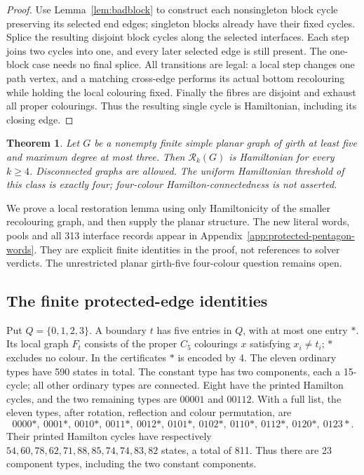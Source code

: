 \documentclass[11pt]{article}
\newtheorem{theorem}{Theorem}[section]
\theoremstyle{remark}
\newcommand{\Rk}{\mathcal R_k}
\numberwithin{equation}{section}
\numberwithin{table}{section}
\begin{document}
\begin{proof}
Use Lemma~\ref{lem:badblock} to construct each nonsingleton block
cycle preserving its selected end edges; singleton blocks already
have their fixed cycles. Splice the resulting disjoint block cycles
along the selected interfaces. Each step joins two cycles into one,
and every later selected edge is still present. The one-block case
needs no final splice. All transitions are legal: a local step changes
one path vertex, and a matching cross-edge performs its actual bottom
recolouring while holding the local colouring fixed. Finally the fibres
are disjoint and exhaust all proper colourings. Thus the resulting
single cycle is Hamiltonian, including its closing edge.
\end{proof}



\begin{theorem}\label{thm:subcubic}
Let $G$ be a nonempty finite simple planar graph of girth at least five
and maximum degree at most three. Then $\Rk(G)$ is Hamiltonian for
every $k\ge4$. Disconnected graphs are allowed. The uniform Hamiltonian threshold
of this class is exactly four; four-colour Hamilton-connectedness is not asserted.
\end{theorem}

We prove a local restoration lemma using only Hamiltonicity of the
smaller recolouring graph, and then supply the planar structure.
The new literal words, pools and all 313 interface records appear in
Appendix~\ref{app:protected-pentagon-words}. They are explicit finite
identities in the proof, not references to solver verdicts.
The unrestricted planar girth-five four-colour question remains open.

\subsection{The finite protected-edge identities}
Put $Q=\{0,1,2,3\}$. A boundary $t$ has five entries in $Q$, with at most
one entry $\ast$. Its local graph $F_t$ consists of the proper $C_5$
colourings $x$ satisfying $x_i\ne t_i$; $\ast$ excludes no colour.
In the certificates $\ast$ is encoded by 4.
The eleven ordinary types have 590 states in total.
The constant type has two components, each a 15-cycle; all other
ordinary types are connected. Eight have the printed Hamilton cycles,
and the two remaining types are $00001$ and $00112$.
With a full list, the eleven types, after rotation, reflection and
colour permutation, are
\[
0000\ast,\ 0001\ast,\ 0010\ast,\ 0011\ast,\ 0012\ast,\
0101\ast,\ 0102\ast,\ 0110\ast,\ 0112\ast,\ 0120\ast,\ 0123\ast.
\]
Their printed Hamilton cycles have respectively
$54,60,78,62,71,88,85,74,74,83,82$ states, a total of 811.
Thus there are 23 component types, including the two constant components.
\end{document}
